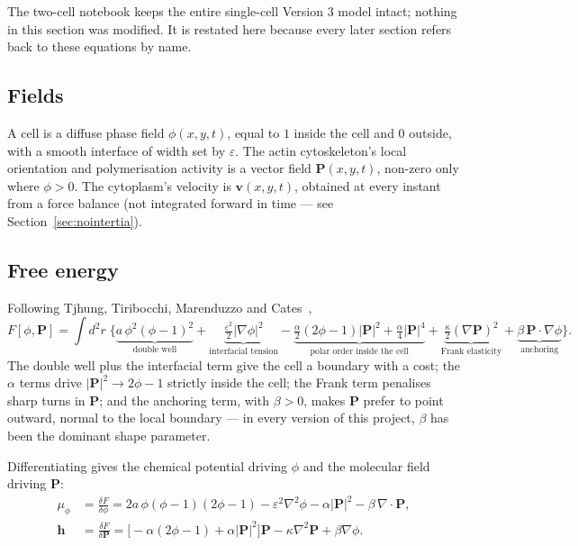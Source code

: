 \documentclass[11pt]{article}
\newcommand{\bP}{\mathbf{P}}
\newcommand{\bv}{\mathbf{v}}
\newcommand{\bh}{\mathbf{h}}
\begin{document}
The two-cell notebook keeps the entire single-cell Version 3 model
intact; nothing in this section was modified. It is restated here
because every later section refers back to these equations by name.

\subsection{Fields}
A cell is a diffuse phase field $\phi(x,y,t)$, equal to $1$ inside the
cell and $0$ outside, with a smooth interface of width set by
$\varepsilon$. The actin cytoskeleton's local orientation and
polymerisation activity is a vector field $\bP(x,y,t)$, non-zero only
where $\phi>0$. The cytoplasm's velocity is $\bv(x,y,t)$, obtained at
every instant from a force balance (not integrated forward in time —
see Section~\ref{sec:nointertia}).

\subsection{Free energy}
Following Tjhung, Tiribocchi, Marenduzzo and Cates~\cite{Tjhung2015},
\begin{equation}
F[\phi,\bP] = \int d^2r\;\Big\{
\underbrace{a\,\phi^2(\phi-1)^2}_{\text{double well}}
+\underbrace{\tfrac{\varepsilon^2}{2}|\nabla\phi|^2}_{\text{interfacial tension}}
-\underbrace{\tfrac{\alpha}{2}(2\phi-1)|\bP|^2+\tfrac{\alpha}{4}|\bP|^4}_{\text{polar order inside the cell}}
+\underbrace{\tfrac{\kappa}{2}(\nabla\bP)^2}_{\text{Frank elasticity}}
+\underbrace{\beta\,\bP\cdot\nabla\phi}_{\text{anchoring}}
\Big\}.
\label{eq:F}
\end{equation}
The double well plus the interfacial term give the cell a boundary
with a cost; the $\alpha$ terms drive $|\bP|^2\to2\phi-1$ strictly
inside the cell; the Frank term penalises sharp turns in $\bP$; and
the anchoring term, with $\beta>0$, makes $\bP$ prefer to point
outward, normal to the local boundary — in every version of this
project, $\beta$ has been the dominant shape parameter.

Differentiating gives the chemical potential driving $\phi$ and the
molecular field driving $\bP$:
\begin{align}
\mu_\phi &= \frac{\delta F}{\delta\phi}
= 2a\,\phi(\phi-1)(2\phi-1) - \varepsilon^2\nabla^2\phi - \alpha|\bP|^2 - \beta\,\nabla\!\cdot\!\bP,
\label{eq:mu}\\
\bh &= \frac{\delta F}{\delta\bP}
= \big[-\alpha(2\phi-1)+\alpha|\bP|^2\big]\bP - \kappa\nabla^2\bP + \beta\nabla\phi.
\label{eq:h}
\end{align}
\end{document}
